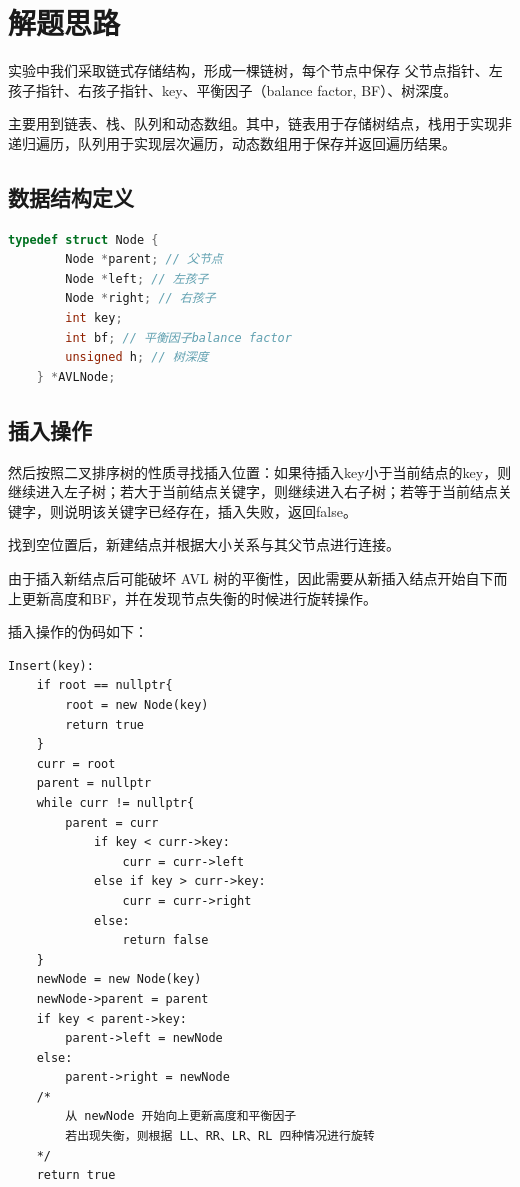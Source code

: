 \documentclass[a4paper, 12pt, oneside]{article}
\theoremstyle{cn_theorem}
\begin{document}
\section{解题思路}
实验中我们采取链式存储结构，形成一棵链树，每个节点中保存
父节点指针、左孩子指针、右孩子指针、key、平衡因子（balance factor, BF）、树深度。

主要用到链表、栈、队列和动态数组。其中，链表用于存储树结点，栈用于实现非递归遍历，队列用于实现层次遍历，动态数组用于保存并返回遍历结果。

\subsection{数据结构定义}

\begin{lstlisting}[language=C++]
    typedef struct Node {
        Node *parent; // 父节点
        Node *left; // 左孩子
        Node *right; // 右孩子
        int key;
        int bf; // 平衡因子balance factor
        unsigned h; // 树深度
    } *AVLNode;
\end{lstlisting}

\subsection{插入操作}
然后按照二叉排序树的性质寻找插入位置：如果待插入key小于当前结点的key，则继续进入左子树；若大于当前结点关键字，则继续进入右子树；若等于当前结点关键字，则说明该关键字已经存在，插入失败，返回false。

找到空位置后，新建结点并根据大小关系与其父节点进行连接。

由于插入新结点后可能破坏 AVL 树的平衡性，因此需要从新插入结点开始自下而上更新高度和BF，并在发现节点失衡的时候进行旋转操作。

插入操作的伪码如下：

\begin{lstlisting}
Insert(key):
    if root == nullptr{
        root = new Node(key)
        return true
    }
    curr = root
    parent = nullptr
    while curr != nullptr{
        parent = curr
            if key < curr->key:
                curr = curr->left
            else if key > curr->key:
                curr = curr->right
            else:
                return false
    }
    newNode = new Node(key)
    newNode->parent = parent
    if key < parent->key:
        parent->left = newNode
    else:
        parent->right = newNode
    /*
        从 newNode 开始向上更新高度和平衡因子
        若出现失衡，则根据 LL、RR、LR、RL 四种情况进行旋转
    */
    return true
\end{lstlisting}
\end{document}
